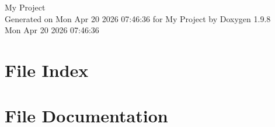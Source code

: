 \documentclass[twoside]{book}
\newcommand{\+}{\discretionary{\mbox{\scriptsize$\hookleftarrow$}}{}{}}
\newcommand{\clearemptydoublepage}{%
    \newpage{\pagestyle{empty}\cleardoublepage}%
  }
\begin{document}
  \raggedbottom
    \hypersetup{pageanchor=false,
                bookmarksnumbered=true,
                pdfencoding=unicode
               }
  \begin{titlepage}
  \vspace*{7cm}
  \begin{center}%
  {\Large My Project}\\
  \vspace*{1cm}
  {\large Generated on Mon Apr 20 2026 07\+:46\+:36 for My Project by Doxygen 1.9.8}\\
    \vspace*{0.5cm}
    {\small Mon Apr 20 2026 07:46:36}
  \end{center}
  \end{titlepage}
  \clearemptydoublepage
  \tableofcontents
  \clearemptydoublepage
  \hypersetup{pageanchor=true}

\chapter{File Index}

\chapter{File Documentation}


  \backmatter
  \newpage
  \clearemptydoublepage
  \printindex
\end{document}
